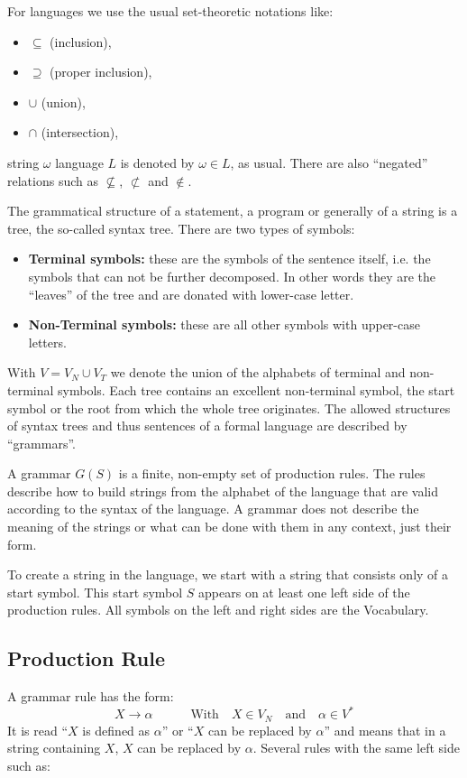 For languages we use the usual set-theoretic notations like:
\begin{itemize}
\item $\subseteq$ (inclusion), 
\item $\supseteq$ (proper inclusion), 
\item $\cup$ (union), 
\item $\cap$ (intersection), 
\end{itemize}

 string $\omega$  language $L$  is denoted by $\omega \in L$, as usual. There are also ``negated'' relations such as $\not\subseteq$, $\not\subset$ and $\not\in$.

The grammatical structure of a statement, a program or generally of a string is a tree, the so-called syntax tree. There are two types of symbols:
\begin{itemize}
\item \textbf{Terminal symbols: }these are the symbols of the sentence itself, i.e. the symbols that can not be further decomposed. In other words they are the ``leaves'' of the tree and are donated with lower-case letter. 
\item \textbf{Non-Terminal symbols: }these are all other symbols with upper-case letters.
\end{itemize}
With $V=V_N \cup V_T$ we denote the union of the alphabets of terminal and non-terminal symbols.
Each tree contains an excellent non-terminal symbol, the start symbol or the root from which the whole tree originates. The allowed structures of syntax trees and thus sentences of a formal language are described by ``grammars''.

A grammar $G(S)$ is a finite, non-empty set of production rules. The rules describe how to build strings from the alphabet of the language that are valid according to the syntax of the language. A grammar does not describe the meaning of the strings or what can be done with them in any context, just their form.

To create a string in the language, we start with a string that consists only of a start symbol. This start symbol $S$ appears on at least one left side of the production rules. All symbols on the left and right sides are the Vocabulary.
\subsection{Production Rule}
A grammar rule has the form:
$$X \rightarrow \alpha \qquad \quad \textrm{With} \quad X \in V_N \quad \textrm{and} \quad \alpha \in V^*$$
It is read ``$X$ is defined as $\alpha$'' or ``$X$ can be replaced by $\alpha$'' and means that in a string containing $X$, $X$ can be replaced by $\alpha$. Several rules with the same left side such as:

